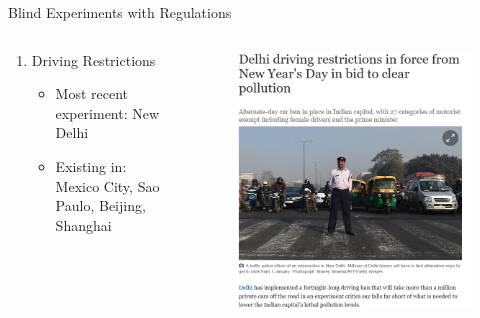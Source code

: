 \documentclass[newPxFont]{beamer}
\begin{document}
\begin{frame}[c]{Blind Experiments with Regulations}
	\begin{columns}
		\begin{column}{.53\linewidth}
			\begin{enumerate}   
				\item{Driving Restrictions}
				\begin{itemize}
					\item{Most recent experiment: New Delhi}  
					\item{Existing in: Mexico City, Sao Paulo, Beijing, Shanghai}
				\end{itemize}  
			\end{enumerate}
		\end{column}
		\begin{column}{.45\linewidth}
			\begin{figure}
				\centering
				\includegraphics[width=1.05\linewidth]{Delhi.png}
			\end{figure}
		\end{column}
	\end{columns}
\end{frame}
\end{document}

